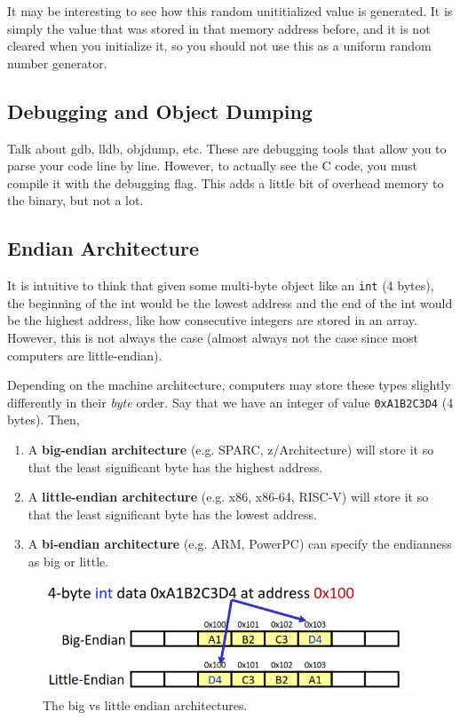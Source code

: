 \documentclass{article}
\begin{document}
    It may be interesting to see how this random unititialized value is generated. It is simply the value that was stored in that memory address before, and it is not cleared when you initialize it, so you should not use this as a uniform random number generator. 

  \subsection{Debugging and Object Dumping} 

    Talk about gdb, lldb, objdump, etc. These are debugging tools that allow you to parse your code line by line. However, to actually see the C code, you must compile it with the debugging flag. This adds a little bit of overhead memory to the binary, but not a lot. 

  \subsection{Endian Architecture}

    It is intuitive to think that given some multi-byte object like an \texttt{int} (4 bytes), the beginning of the int would be the lowest address and the end of the int would be the highest address, like how consecutive integers are stored in an array. However, this is not always the case (almost always not the case since most computers are little-endian).  

    \begin{definition}
      Depending on the machine architecture, computers may store these types slightly differently in their \textit{byte} order. Say that we have an integer of value \texttt{0xA1B2C3D4} (4 bytes). Then, 
      \begin{enumerate} 
        \item A \textbf{big-endian architecture} (e.g. SPARC, z/Architecture) will store it so that the least significant byte has the highest address.
        \item A \textbf{little-endian architecture} (e.g. x86, x86-64, RISC-V) will store it so that the least significant byte has the lowest address. 
        \item A \textbf{bi-endian architecture} (e.g. ARM, PowerPC) can specify the endianness as big or little. 
      \end{enumerate}

      \begin{figure}[H]
        \centering 
        \includegraphics[scale=0.4]{img/endianness.png}
        \caption{The big vs little endian architectures. } 
        \label{fig:endianness}
      \end{figure}
    \end{definition}
\end{document}
